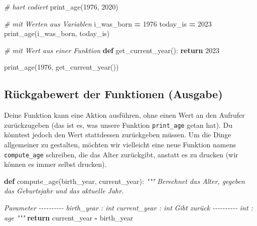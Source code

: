 \documentclass[
]{book}
\newenvironment{Shaded}{\begin{snugshade}}{\end{snugshade}}
\newcommand{\CommentTok}[1]{\textcolor[rgb]{0.56,0.35,0.01}{\textit{#1}}}
\newcommand{\ControlFlowTok}[1]{\textcolor[rgb]{0.13,0.29,0.53}{\textbf{#1}}}
\newcommand{\DecValTok}[1]{\textcolor[rgb]{0.00,0.00,0.81}{#1}}
\newcommand{\KeywordTok}[1]{\textcolor[rgb]{0.13,0.29,0.53}{\textbf{#1}}}
\newcommand{\NormalTok}[1]{#1}
\newcommand{\OperatorTok}[1]{\textcolor[rgb]{0.81,0.36,0.00}{\textbf{#1}}}
\begin{document}
\begin{Shaded}
\begin{Highlighting}[]
\CommentTok{\# hart codiert}
\NormalTok{print\_age(}\DecValTok{1976}\NormalTok{, }\DecValTok{2020}\NormalTok{)}

\CommentTok{\# mit Werten aus Variablen}
\NormalTok{i\_was\_born }\OperatorTok{=} \DecValTok{1976}
\NormalTok{today\_is }\OperatorTok{=} \DecValTok{2023}
\NormalTok{print\_age(i\_was\_born, today\_is)}

\CommentTok{\# mit Wert aus einer Funktion}
\KeywordTok{def}\NormalTok{ get\_current\_year():}
    \ControlFlowTok{return} \DecValTok{2023}

\NormalTok{print\_age(}\DecValTok{1976}\NormalTok{, get\_current\_year())}
\end{Highlighting}
\end{Shaded}

\hypertarget{ruxfcckgabewert-der-funktionen-ausgabe}{%
\subsection{Rückgabewert der Funktionen (Ausgabe)}\label{ruxfcckgabewert-der-funktionen-ausgabe}}

Deine Funktion kann eine Aktion ausführen, ohne einen Wert an den Aufrufer zurückzugeben (das ist es, was unsere Funktion \texttt{print\_age} getan hat). Du könntest jedoch den Wert stattdessen zurückgeben müssen. Um die Dinge allgemeiner zu gestalten, möchten wir vielleicht eine neue Funktion namens \texttt{compute\_age} schreiben, die das Alter zurückgibt, anstatt es zu drucken (wir können es immer selbst drucken).

\begin{Shaded}
\begin{Highlighting}[]
\KeywordTok{def}\NormalTok{ compute\_age(birth\_year, current\_year):}
    \CommentTok{"""}
\CommentTok{    Berechnet das Alter, gegeben das Geburtsjahr und das aktuelle Jahr.}

\CommentTok{    Parameter}
\CommentTok{    {-}{-}{-}{-}{-}{-}{-}{-}{-}{-}}
\CommentTok{    birth\_year : int}
\CommentTok{    current\_year : int}
\CommentTok{    }
\CommentTok{    Gibt zurück}
\CommentTok{    {-}{-}{-}{-}{-}{-}{-}{-}{-}{-}}
\CommentTok{    int : age}
\CommentTok{    """}
    \ControlFlowTok{return}\NormalTok{ current\_year }\OperatorTok{{-}}\NormalTok{ birth\_year}
\end{Highlighting}
\end{Shaded}
\end{document}
